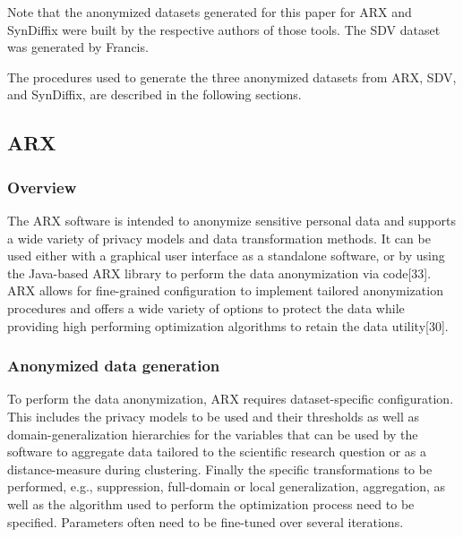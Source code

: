 \documentclass[10pt]{article}
\newcommand{\mycite}[1]{[#1]}
\begin{document}
Note that the anonymized datasets generated for this paper for ARX and SynDiffix were built by the respective authors of those tools. The SDV dataset was generated by Francis.

The procedures used to generate the three anonymized datasets from ARX, SDV, and SynDiffix, are described in the following sections.

\subsection*{ARX}
\label{sec:method_arx}

\subsubsection*{Overview}

The ARX software is intended to anonymize sensitive personal data and supports a wide variety of privacy models and data transformation methods. It can be used either with a graphical user interface as a standalone software, or by using the Java-based ARX library to perform the data anonymization via code\mycite{33}. ARX allows for fine-grained configuration to implement tailored anonymization procedures and offers a wide variety of options to protect the data while providing high performing optimization algorithms to retain the data utility\mycite{30}. 

\subsubsection*{Anonymized data generation}

To perform the data anonymization, ARX requires dataset-specific configuration. This includes the privacy models to be used and their thresholds as well as domain-generalization hierarchies for the variables that can be used by the software to aggregate data tailored to the scientific research question or as a distance-measure during clustering. Finally the specific transformations to be performed, e.g., suppression, full-domain or local generalization, aggregation, as well as the algorithm used to perform the optimization process need to be specified. Parameters often need to be fine-tuned over several iterations.
\end{document}
